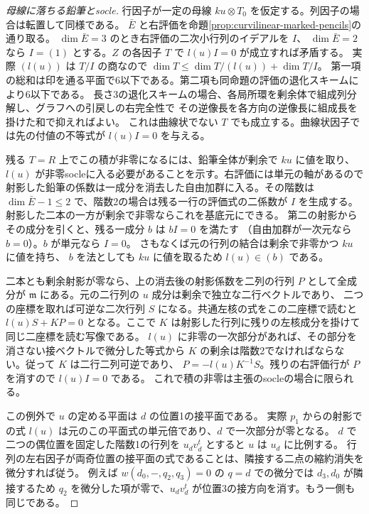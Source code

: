 \begin{proof}[母線に落ちる鉛筆とsocle]
行因子が一定の母線 $ku\otimes T_0$ を仮定する。列因子の場合は転置して同様である。
$\bar E$ と右評価を命題\ref{prop:curvilinear-marked-pencils}の通り取る。
$\dim\bar E=3$ のとき右評価の二次小行列のイデアルを $I$、
$\dim\bar E=2$ なら $I=(1)$ とする。$Z$ の各因子 $T$ で $l(u)I=0$ が成立すれば矛盾する。
実際 $(l(u))$ は $T/I$ の商なので $\dim T\le\dim T/(l(u))+\dim T/I$。
第一項の総和は印を通る平面で6以下である。第二項も同命題の評価の退化スキームにより6以下である。
長さ3の退化スキームの場合、各局所環を剰余体で組成列分解し、グラフへの引戻しの右完全性で
その逆像長を各方向の逆像長に組成長を掛けた和で抑えればよい。
これは曲線状でない $T$ でも成立する。曲線状因子では先の付値の不等式が $l(u)I=0$ を与える。

残る $T=R$ 上でこの積が非零になるには、鉛筆全体が剰余で $ku$ に値を取り、
$l(u)$ が非零socleに入る必要があることを示す。右評価には単元の軸があるので
射影した鉛筆の係数は一成分を消去した自由加群に入る。その階数は
$\dim\bar E-1\le2$ で、階数2の場合は残る一行の評価式の二係数が $I$ を生成する。
射影した二本の一方が剰余で非零ならこれを基底元にできる。
第二の射影からその成分を引くと、残る一成分 $b$ は $bI=0$ を満たす
（自由加群が一次元なら $b=0$）。$b$ が単元なら $I=0$。
さもなくば元の行列の結合は剰余で非零かつ $ku$ に値を持ち、
$b$ を法としても $ku$ に値を取るため $l(u)\in(b)$ である。

二本とも剰余射影が零なら、上の消去後の射影係数を二列の行列 $P$ として全成分が
$\mathfrak m$ にある。元の二行列の $u$ 成分は剰余で独立な二行ベクトルであり、
二つの座標を取れば可逆な二次行列 $S$ になる。共通左核の式をこの二座標で読むと
$l(u) S+KP=0$ となる。ここで $K$ は射影した行列に残りの左核成分を掛けて同じ二座標を読む写像である。
$l(u)$ に非零の一次部分があれば、その部分を消さない接ベクトルで微分した等式から
$K$ の剰余は階数2でなければならない。従って $K$ は二行二列可逆であり、
$P=-l(u)K^{-1}S$。残りの右評価行が $P$ を消すので $l(u)I=0$ である。
これで積の非零は主張のsocleの場合に限られる。

この例外で $u$ の定める平面は $d$ の位置1の接平面である。
実際 $p_1$ からの射影での式 $l(u)$ は元のこの平面式の単元倍であり、$d$ で一次部分が零となる。
$d$ で二つの偶位置を固定した階数1の行列を $u_d v_d^t$ とすると $u$ は $u_d$ に比例する。
行列の左右因子が両奇位置の接平面の式であることは、隣接する二点の縮約消失を微分すれば従う。
例えば $w(d_0,-,q_2,q_3)=0$ の $q=d$ での微分では $d_3,d_0$ が隣接するため
$q_2$ を微分した項が零で、$u_d v_d^t$ が位置3の接方向を消す。もう一側も同じである。
\end{proof}

